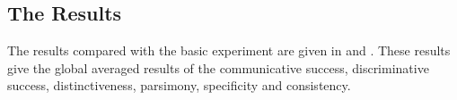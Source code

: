 \subsection{The Results}

The results compared with the basic experiment are given in  and . These results give the global averaged results of the communicative success, discriminative success, distinctiveness, parsimony, specificity and consistency.

\begin{figure}
\centering
{}
\\
\\

\end{figure}
